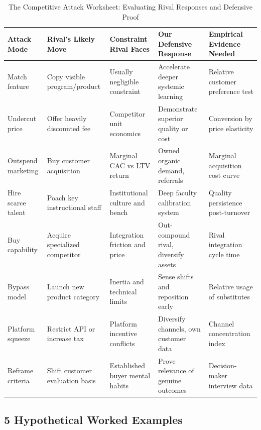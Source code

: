 \begin{table}[t]
\centering
\small
\caption{The Competitive Attack Worksheet: Evaluating Rival Responses and Defensive Proof}
\label{tab:competitive_attack_worksheet}
\begin{tabularx}{\textwidth}{p{2.2cm} p{2.8cm} p{2.8cm} p{3.2cm} X}
\toprule
\textbf{Attack Mode} & \textbf{Rival's Likely Move} & \textbf{Constraint Rival Faces} & \textbf{Our Defensive Response} & \textbf{Empirical Evidence Needed} \\
\midrule
Match feature & Copy visible program/product & Usually negligible constraint & Accelerate deeper systemic learning & Relative customer preference test \\
\addlinespace[2pt]
Undercut price & Offer heavily discounted fee & Competitor unit economics & Demonstrate superior quality or cost & Conversion by price elasticity \\
\addlinespace[2pt]
Outspend marketing & Buy customer acquisition & Marginal CAC vs LTV return & Owned organic demand, referrals & Marginal acquisition cost curve \\
\addlinespace[2pt]
Hire scarce talent & Poach key instructional staff & Institutional culture and bench & Deep faculty calibration system & Quality persistence post-turnover \\
\addlinespace[2pt]
Buy capability & Acquire specialized competitor & Integration friction and price & Out-compound rival, diversify assets & Rival integration cycle time \\
\addlinespace[2pt]
Bypass model & Launch new product category & Inertia and technical limits & Sense shifts and reposition early & Relative usage of substitutes \\
\addlinespace[2pt]
Platform squeeze & Restrict API or increase tax & Platform incentive conflicts & Diversify channels, own customer data & Channel concentration index \\
\addlinespace[2pt]
Reframe criteria & Shift customer evaluation basis & Established buyer mental habits & Prove relevance of genuine outcomes & Decision-maker interview data \\
\bottomrule
\end{tabularx}
\end{table}

\subsection{5 Hypothetical Worked Examples}
\label{sec:five_worked_examples}

